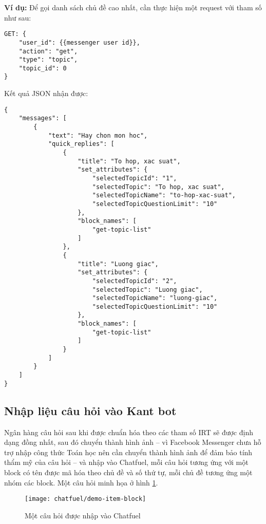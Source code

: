 \noindent\textbf{Ví dụ:} Để gọi danh sách chủ đề cao nhất, cần thực hiện một request với tham số như sau:
\begin{lstlisting}
GET: {
	"user_id": {{messenger user id}},
	"action": "get",
	"type": "topic",
	"topic_id": 0
}
\end{lstlisting}\par
Kết quả JSON nhận được:
\begin{lstlisting}
{
    "messages": [
        {
            "text": "Hay chon mon hoc",
            "quick_replies": [
                {
                    "title": "To hop, xac suat",
                    "set_attributes": {
                        "selectedTopicId": "1",
                        "selectedTopic": "To hop, xac suat",
                        "selectedTopicName": "to-hop-xac-suat",
                        "selectedTopicQuestionLimit": "10"
                    },
                    "block_names": [
                        "get-topic-list"
                    ]
                },
                {
                    "title": "Luong giac",
                    "set_attributes": {
                        "selectedTopicId": "2",
                        "selectedTopic": "Luong giac",
                        "selectedTopicName": "luong-giac",
                        "selectedTopicQuestionLimit": "10"
                    },
                    "block_names": [
                        "get-topic-list"
                    ]
                }
            ]
        }
    ]
}
\end{lstlisting}
\subsection{Nhập liệu câu hỏi vào Kant bot}
Ngân hàng câu hỏi sau khi được chuẩn hóa theo các tham số IRT sẽ được định dạng đồng nhất, sau đó chuyển thành hình ảnh – vì Facebook Messenger chưa hỗ trợ nhập công thức Toán học nên cần chuyển thành hình ảnh để đảm bảo tính thẩm mỹ của câu hỏi – và nhập vào Chatfuel, mỗi câu hỏi tương ứng với một block có tên được mã hóa theo chủ đề và số thứ tự, mỗi chủ đề tương ứng một nhóm các block. Một câu hỏi minh họa ở hình \ref{fig:fig-c3-demo-item-block}.
\begin{figure}[htb!]\centering
	\texttt{[image: chatfuel/demo-item-block]}
	\caption{Một câu hỏi được nhập vào Chatfuel}
	\label{fig:fig-c3-demo-item-block}
\end{figure}\par

